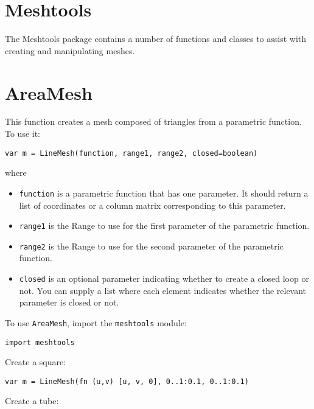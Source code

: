 \hypertarget{meshtools}{%
\section{Meshtools}\label{meshtools}}

The Meshtools package contains a number of functions and classes to
assist with creating and manipulating meshes.

\hypertarget{areamesh}{%
\section{AreaMesh}\label{areamesh}}

This function creates a mesh composed of triangles from a parametric
function. To use it:

\begin{lstlisting}
var m = LineMesh(function, range1, range2, closed=boolean)
\end{lstlisting}

where

\begin{itemize}

\item
  \texttt{function} is a parametric function that has one parameter. It
  should return a list of coordinates or a column matrix corresponding
  to this parameter.
\item
  \texttt{range1} is the Range to use for the first parameter of the
  parametric function.
\item
  \texttt{range2} is the Range to use for the second parameter of the
  parametric function.
\item
  \texttt{closed} is an optional parameter indicating whether to create
  a closed loop or not. You can supply a list where each element
  indicates whether the relevant parameter is closed or not.
\end{itemize}

To use \texttt{AreaMesh}, import the \texttt{meshtools} module:

\begin{lstlisting}
import meshtools
\end{lstlisting}

Create a square:

\begin{lstlisting}
var m = LineMesh(fn (u,v) [u, v, 0], 0..1:0.1, 0..1:0.1)
\end{lstlisting}

Create a tube:

